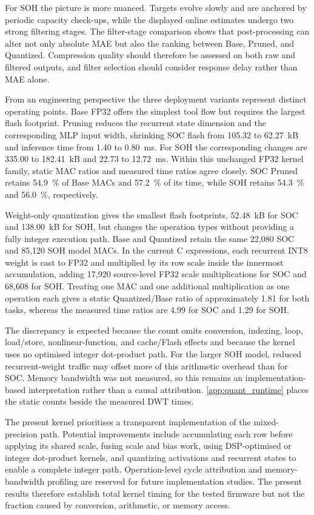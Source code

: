 \documentclass[review]{elsarticle}
\newcommand{\code}[1]{\path{#1}}
\begin{document}
For SOH the picture is more nuanced. Targets evolve slowly and are anchored by periodic capacity check-ups, while the displayed online estimates undergo two strong filtering stages. The filter-stage comparison shows that post-processing can alter not only absolute MAE but also the ranking between Base, Pruned, and Quantized. Compression quality should therefore be assessed on both raw and filtered outputs, and filter selection should consider response delay rather than MAE alone.

From an engineering perspective the three deployment variants represent distinct operating points. Base FP32 offers the simplest tool flow but requires the largest flash footprint. Pruning reduces the recurrent state dimension and the corresponding MLP input width, shrinking SOC flash from 105.32 to 62.27~kB and inference time from 1.40 to 0.80~ms. For SOH the corresponding changes are 335.00 to 182.41~kB and 22.73 to 12.72~ms. Within this unchanged FP32 kernel family, static MAC ratios and measured time ratios agree closely. SOC Pruned retains 54.9~\% of Base MACs and 57.2~\% of its time, while SOH retains 54.3~\% and 56.0~\%, respectively.

Weight-only quantization gives the smallest flash footprints, 52.48~kB for SOC and 138.00~kB for SOH, but changes the operation types without providing a fully integer execution path. Base and Quantized retain the same 22,080 SOC and 85,120 SOH model MACs. In the current C expressions, each recurrent INT8 weight is cast to FP32 and multiplied by its row scale inside the innermost accumulation, adding 17,920 source-level FP32 scale multiplications for SOC and 68,608 for SOH. Treating one MAC and one additional multiplication as one operation each gives a static Quantized/Base ratio of approximately 1.81 for both tasks, whereas the measured time ratios are 4.99 for SOC and 1.29 for SOH.

The discrepancy is expected because the count omits conversion, indexing, loop, load/store, nonlinear-function, and cache/Flash effects and because the \code{-O0} kernel uses no optimised integer dot-product path. For the larger SOH model, reduced recurrent-weight traffic may offset more of this arithmetic overhead than for SOC. Memory bandwidth was not measured, so this remains an implementation-based interpretation rather than a causal attribution. \ref{app:quant_runtime} places the static counts beside the measured DWT times.

The present kernel prioritises a transparent implementation of the mixed-precision path. Potential improvements include accumulating each row before applying its shared scale, fusing scale and bias work, using DSP-optimised or integer dot-product kernels, and quantizing activations and recurrent states to enable a complete integer path. Operation-level cycle attribution and memory-bandwidth profiling are reserved for future implementation studies. The present results therefore establish total kernel timing for the tested firmware but not the fraction caused by conversion, arithmetic, or memory access.
\end{document}
